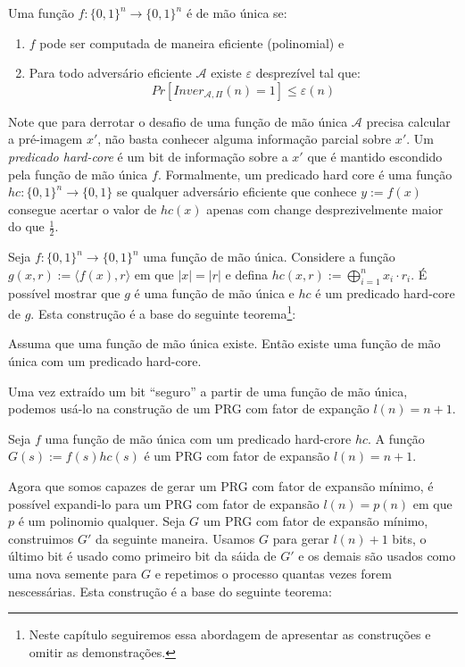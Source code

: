 Uma função $f: \{0,1\}^n \to \{0,1\}^n$ é de mão única se:
\begin{enumerate}
\item $f$ pode ser computada de maneira eficiente (polinomial) e
\item Para todo adversário eficiente $\mathcal{A}$ existe $\varepsilon$ desprezível tal que:
\begin{displaymath}
  Pr[Inver_{\mathcal{A}, \Pi}(n) = 1] \leq \varepsilon(n)
\end{displaymath}
\end{enumerate}

Note que para derrotar o desafio de uma função de mão única $\mathcal{A}$ precisa calcular a pré-imagem $x'$, não basta conhecer alguma informação parcial sobre $x'$.
Um {\em predicado hard-core} é um bit de informação sobre a $x'$ que é mantido escondido pela função de mão única $f$.
Formalmente, um predicado hard core é uma função $hc:\{0,1\}^n \to \{0,1\}$ se qualquer adversário eficiente que conhece $y := f(x)$ consegue acertar o valor de $hc(x)$ apenas com change desprezivelmente maior do que $\frac{1}{2}$.


Seja $f:\{0,1\}^n \to \{0,1\}^n$ uma função de mão única.
Considere a função $g(x,r) := \langle f(x), r \rangle$ em que $|x| = |r|$ e defina $hc(x,r) := \bigoplus_{i=1}^nx_i \cdot r_i$.
É possível mostrar que $g$ é uma função de mão única e $hc$ é um predicado hard-core de $g$.
Esta construção é a base do seguinte teorema\footnote{Neste capítulo seguiremos essa abordagem de apresentar as construções e omitir as demonstrações.}:

\begin{theorem}
  Assuma que uma função de mão única existe. Então existe uma função de mão única com um predicado hard-core.
\end{theorem}

Uma vez extraído um bit ``seguro'' a partir de uma função de mão única, podemos usá-lo na construção de um PRG com fator de expanção $l(n) = n + 1$.

\begin{theorem}
  Seja $f$ uma função de mão única com um predicado hard-crore $hc$.
A função $G(s) := f(s)hc(s)$ é um PRG com fator de expansão $l(n) = n+1$.
\end{theorem}

Agora que somos capazes de gerar um PRG com fator de expansão mínimo, é possível expandi-lo para um PRG com fator de expansão $l(n) = p(n)$ em que $p$ é um polinomio qualquer.
Seja $G$ um PRG com fator de expansão mínimo, construimos $G'$ da seguinte maneira.
Usamos $G$ para gerar $l(n)+1$ bits, o último bit é usado como primeiro bit da sáida de $G'$ e os demais são usados como uma nova semente para $G$ e repetimos o processo quantas vezes forem nescessárias.
Esta construção é a base do seguinte teorema:


